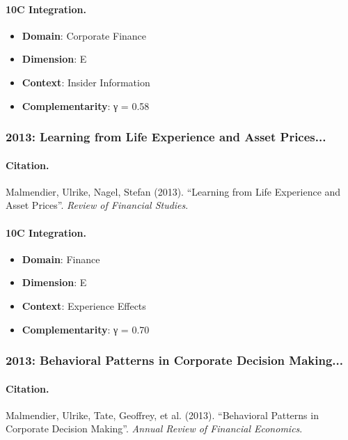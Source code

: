 \paragraph{10C Integration.}
\begin{itemize}[nosep]
  \item \textbf{Domain}: Corporate Finance
  \item \textbf{Dimension}: E
  \item \textbf{Context}: Insider Information
  \item \textbf{Complementarity}: γ = 0.58
\end{itemize}


\subsubsection{2013: Learning from Life Experience and Asset Prices...}

\paragraph{Citation.}
Malmendier, Ulrike, Nagel, Stefan (2013). ``Learning from Life Experience and Asset Prices''. \textit{Review of Financial Studies}.

\paragraph{10C Integration.}
\begin{itemize}[nosep]
  \item \textbf{Domain}: Finance
  \item \textbf{Dimension}: E
  \item \textbf{Context}: Experience Effects
  \item \textbf{Complementarity}: γ = 0.70
\end{itemize}


\subsubsection{2013: Behavioral Patterns in Corporate Decision Making...}

\paragraph{Citation.}
Malmendier, Ulrike, Tate, Geoffrey, et al. (2013). ``Behavioral Patterns in Corporate Decision Making''. \textit{Annual Review of Financial Economics}.

